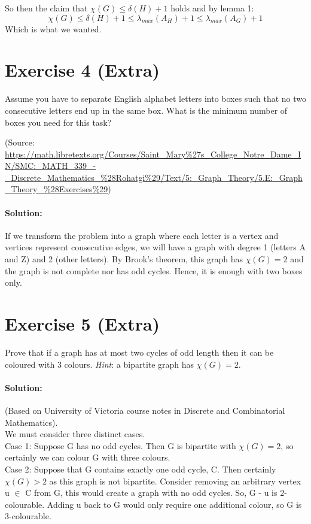 \documentclass{article}
\begin{document}
So then the claim that $\chi(G) \leq \delta(H) + 1$ holds and by lemma 1: $$\chi(G) \leq \delta(H) + 1 \leq \lambda_{max}(A_{H}) + 1 \leq \lambda_{max}(A_{G}) + 1$$
Which is what we wanted.

\section*{Exercise 4 (Extra)}
Assume you have to separate English alphabet letters into boxes such that no two consecutive letters end up in the same box. What is the minimum number of boxes you need for this task?

\noindent
(Source: \url {https://math.libretexts.org/Courses/Saint_Mary%27s_College_Notre_Dame_IN/SMC:_MATH_339_-_Discrete_Mathematics_%28Rohatgi%29/Text/5:_Graph_Theory/5.E:_Graph_Theory_%28Exercises%29})

\paragraph{Solution:}
If we transform the problem into a graph where each letter is a vertex and vertices represent consecutive edges, we will have a graph with degree 1 (letters A and Z) and 2 (other letters). By Brook's theorem, this graph has $\chi(G) = 2$ and the graph is not complete nor has odd cycles. Hence, it is enough with two boxes only.

\section*{Exercise 5 (Extra)}
Prove that if a graph has at most two cycles of odd length then it can be
coloured with 3 colours. \textit{Hint}: a bipartite graph has $\chi(G) = 2$.

\paragraph{Solution:}
(Based on University of Victoria course notes in Discrete and Combinatorial Mathematics).\\

\noindent
We must consider three distinct cases.\\

\noindent
Case 1: Suppose G has no odd cycles. Then G is bipartite with $\chi(G) = 2$, so
certainly we can colour G with three colours.\\

\noindent
Case 2: Suppose that G contains exactly one odd cycle, C. Then certainly
$\chi(G) > 2$ as this graph is not bipartite. Consider removing an arbitrary vertex
u $\in$ C from G, this would create a graph with no odd cycles. So, G - u is
2-colourable. Adding u back to G would only require one additional colour, so G is 3-colourable.\\
\end{document}
